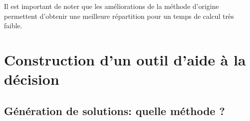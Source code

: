Il est important de noter que les améliorations de la méthode d’origine permettent
d’obtenir une meilleure répartition pour un temps de calcul très faible.





\section{Construction d’un outil d’aide à la décision} %
\label{sec:construction_d_un_outil_d_aide_à_la_decision}


\subsection{Génération de solutions: quelle méthode ?} %
\label{sub:generation_de_solutions_quelle_methode}

